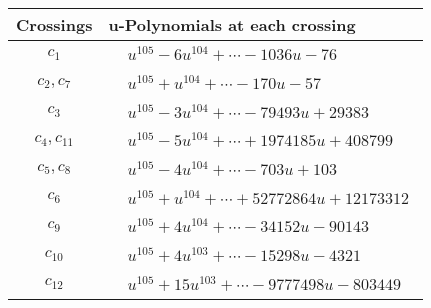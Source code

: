 \documentclass[1p]{elsarticle_modified}
\theoremstyle{definition}
\begin{document}
\begin{tabular}{m{50pt}|m{274pt}}
Crossings & \hspace{64pt}u-Polynomials at each crossing \\
\hline $$\begin{aligned}c_{1}\end{aligned}$$&$\begin{aligned}
&u^{105}-6 u^{104}+\cdots-1036 u-76
\end{aligned}$\\
\hline $$\begin{aligned}c_{2},c_{7}\end{aligned}$$&$\begin{aligned}
&u^{105}+u^{104}+\cdots-170 u-57
\end{aligned}$\\
\hline $$\begin{aligned}c_{3}\end{aligned}$$&$\begin{aligned}
&u^{105}-3 u^{104}+\cdots-79493 u+29383
\end{aligned}$\\
\hline $$\begin{aligned}c_{4},c_{11}\end{aligned}$$&$\begin{aligned}
&u^{105}-5 u^{104}+\cdots+1974185 u+408799
\end{aligned}$\\
\hline $$\begin{aligned}c_{5},c_{8}\end{aligned}$$&$\begin{aligned}
&u^{105}-4 u^{104}+\cdots-703 u+103
\end{aligned}$\\
\hline $$\begin{aligned}c_{6}\end{aligned}$$&$\begin{aligned}
&u^{105}+u^{104}+\cdots+52772864 u+12173312
\end{aligned}$\\
\hline $$\begin{aligned}c_{9}\end{aligned}$$&$\begin{aligned}
&u^{105}+4 u^{104}+\cdots-34152 u-90143
\end{aligned}$\\
\hline $$\begin{aligned}c_{10}\end{aligned}$$&$\begin{aligned}
&u^{105}+4 u^{103}+\cdots-15298 u-4321
\end{aligned}$\\
\hline $$\begin{aligned}c_{12}\end{aligned}$$&$\begin{aligned}
&u^{105}+15 u^{103}+\cdots-9777498 u-803449
\end{aligned}$\\
\hline
\end{tabular}\\~\\
\end{document}
